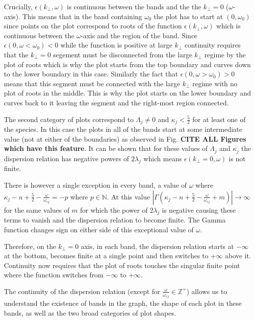 \documentclass[12pt,a4paper]{article}
\begin{document}
    Crucially, $\epsilon(k_\perp, \omega)$ is continuous between the bands and the the $k_\perp = 0$ ($\omega$-axis).
    This means that in the band containing $\omega_0$ the plot has to start at $(0, \omega_0)$ since points on the plot correspond to roots of the function $\epsilon(k_\perp, \omega)$ which is continuous between the $\omega$-axis and the region of the band.
    Since $\epsilon(0, \omega < \omega_0) < 0$ while the function is positive at large $k_\perp$ continuity requires that the $k_\perp = 0$ segement must be disconnected from the large $k_\perp$ regime by the plot of roots which is why the plot starts from the top boundary and curves down to the lower boundary in this case.
    Similarly the fact that $\epsilon(0, \omega > \omega_0) > 0$ means that this segment must be connected with the large $k_\perp$ regime with no plot of roots in the middle.
    This is why the plot starts on the lower boundary and curves back to it leaving the segment and the right-most region connected.

    The second category of plots correspond to $\Lambda_j \neq 0$ and $\kappa_j < \frac{5}{2}$ for at least one of the species.
    In this case the plots in all of the bands start at some intermediate value (not at either of the boundaries) as observed in Fig. \textbf{CITE ALL Figures which have this feature}.
    It can be shown that for these values of $\Lambda_j$ and $\kappa_j$ the dispersion relation has negative powers of $2 \lambda_j$ which means $\epsilon(k_\perp = 0, \omega)$ is not finite.

    There is however a single exception in every band, a value of $\omega$ where $\kappa_j - n + \frac{5}{2} - \frac{\omega}{\omega_{cj}} = -p$ where $p \in \mathbb{N}$.
    At this value $\left| \Gamma (\kappa_j - n + \frac{5}{2} - \frac{\omega}{\omega_{cj}} + m) \right| \rightarrow \infty$ for the same values of $m$ for which the power of $2 \lambda_j$ is negative causing these terms to vanish and the dispersion relation to become finite.
    The Gamma function changes sign on either side of this exceptional value of $\omega$.

    Therefore, on the $k_\perp = 0$ axis, in each band, the dispersion relation starts at $-\infty$ at the bottom, becomes finite at a single point and then switches to $+\infty$ above it.
    Continuity now requires that the plot of roots touches the singular finite point where the function switches from $-\infty$ to $+\infty$.

    The continuity of the dispersion relation (except for $\frac{\omega}{\omega_{cj}} \in \mathbb{Z}^+$) allows us to understand the existence of bands in the graph, the shape of each plot in these bands, as well as the two broad categories of plot shapes.
\end{document}
